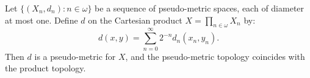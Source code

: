 Let $\{(X_n, d_n) : n \in \omega\}$ be a sequence of pseudo-metric spaces, each of diameter at most one. Define $d$ on the Cartesian product $X = \prod_{n \in \omega} X_n$ by:
$$d(x, y) = \sum_{n=0}^{\infty} 2^{-n} d_n(x_n, y_n).$$
Then $d$ is a pseudo-metric for $X$, and the pseudo-metric topology coincides with the product topology.
